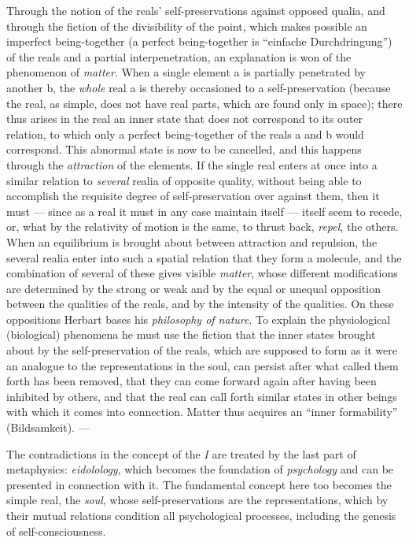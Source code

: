 Through the notion of the reals' self-preservations against opposed
qualia, and through the fiction of the divisibility of the point, which
makes possible an imperfect being-together (a perfect being-together is
``einfache Durchdringung'') of the reals and a partial interpenetration,
an explanation is won of the phenomenon of \emph{matter}. When
a single element a is partially penetrated by another b, the \emph{whole}
real a is thereby occasioned to a self-preservation (because the real, as
simple, does not have real parts, which are found only in space); there
thus arises in the real an inner state that does not correspond to its
outer relation, to which only a perfect being-together of the reals a and
b would correspond. This abnormal state is now to be cancelled, and this
happens through the \emph{attraction} of the elements. If the single real
enters at once into a similar relation to \emph{several} realia of
opposite quality, without being able to accomplish the requisite degree
of self-preservation over against them, then it must --- since as a real
it must in any case maintain itself --- itself seem to recede, or, what by
the relativity of motion is the same, to thrust back, \emph{repel}, the
others. When an equilibrium is brought about between attraction and
repulsion, the several realia enter into such a spatial relation that
they form a molecule, and the combination of several of these gives
visible \emph{matter}, whose different modifications are determined by
the strong or weak and by the equal or unequal opposition between the
qualities of the reals, and by the intensity of the qualities. On these
oppositions Herbart bases his \emph{philosophy of nature}. To explain the
physiological (biological) phenomena he must use the fiction that the
inner states brought about by the self-preservation of the reals, which
are supposed to form as it were an analogue to the representations in the
soul, can persist after what called them forth has been removed, that
they can come forward again after having been inhibited by others, and
that the real can call forth similar states in other beings with which it
comes into connection. Matter thus acquires an ``inner formability''
(Bildsamkeit). ---

The contradictions in the concept of the \emph{I} are treated by the last
part of metaphysics: \emph{eidolology}, which becomes the foundation of
\emph{psychology} and can be presented in connection with it. The
fundamental concept here too becomes the simple real, the \emph{soul},
whose self-preservations are the representations, which by
their mutual relations condition all psychological processes, including
the genesis of self-consciousness.

